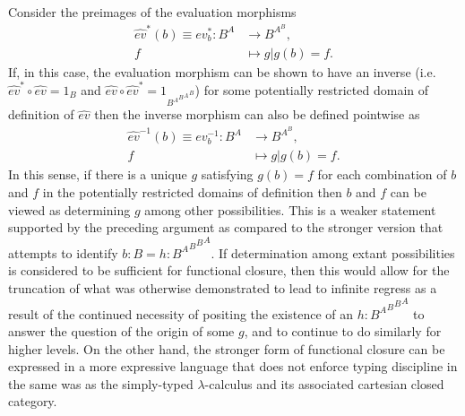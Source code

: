 \documentclass[10pt]{article}
\theoremstyle{plain}
\theoremstyle{definition}
\theoremstyle{remark}
\begin{document}
Consider the preimages of the evaluation morphisms
\begin{align*}
\hat{ev}^{*}(b) \equiv ev^{*}_b \colon B^A &\longrightarrow B^{A^B},\\
f &\longmapsto g |g(b)=f.
\end{align*}
If, in this case, the evaluation morphism can be shown to have an inverse
(i.e. $\hat{ev}^{*} \circ \hat{ev} = 1_B$ and $\hat{ev} \circ \hat{ev}^{*}= 1_{{{{{B^A}^B}^A}^B} }$)
for some potentially restricted domain of definition of $\hat{ev}$ then the inverse morphism can also be defined pointwise as
\begin{align*}
\hat{ev}^{-1}(b) \equiv ev^{-1}_b \colon B^A &\longrightarrow B^{A^B},\\
f &\longmapsto g | g(b) = f.
\end{align*}
In this sense, if there is a unique $g$ satisfying $g(b)=f$ for each combination of $b$ and $f$ in the potentially restricted domains of definition then $b$ and $f$ can be viewed as determining $g$ among other possibilities. This is a weaker statement supported by the preceding argument as compared to the stronger version that attempts to identify $b:B = h:{{{{B^A}^B}^B}^A}$. If determination among extant possibilities is considered to be sufficient for functional closure, then this would allow for the truncation of what was otherwise demonstrated to lead to infinite regress as a result of the continued necessity of positing the existence of an $h:{{{{B^A}^B}^B}^A}$ to answer the question of the origin of some $g$, and to continue to do similarly for higher levels. On the other hand, the stronger form of functional closure can be expressed in a more expressive language that does not enforce typing discipline in the same was as the simply-typed $\lambda$-calculus and its associated cartesian closed category.
\end{document}
